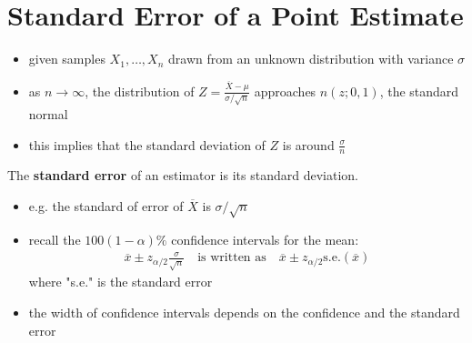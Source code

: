 \documentclass[10pt]{article}
\begin{document}
\section{Standard Error of a Point Estimate}
\begin{itemize}
    \item given samples $X_1, \ldots, X_n$ drawn from an unknown distribution with variance $\sigma$ 
    \item as $n \to \infty$, the distribution of $Z = \frac{\overline{X}-\mu}{\sigma / \sqrt{n} }$ approaches $n(z;0,1)$, the standard normal
    \item this implies that the standard deviation of $Z$ is around $\frac{\sigma}{n}$ 
\end{itemize}
\begin{definition}
    The \textbf{standard error} of an estimator is its standard deviation.
    \begin{itemize}
        \item e.g. the standard of error of $\overline{X}$ is $\sigma / \sqrt{n} $
        \item recall the $100(1-\alpha)\%$ confidence intervals for the mean:
            \begin{gather*}
                \overline{x} \pm z_{\alpha / 2} \frac{\sigma}{\sqrt{n}} \quad \text{is written as} \quad \overline{x} \pm z_{\alpha / 2} \text{s.e.} (\overline{x})
            \end{gather*}
            where "s.e." is the standard error
    \end{itemize}
\end{definition}
\begin{itemize}
    \item the width of confidence intervals depends on the confidence and the standard error
\end{itemize}
\end{document}
